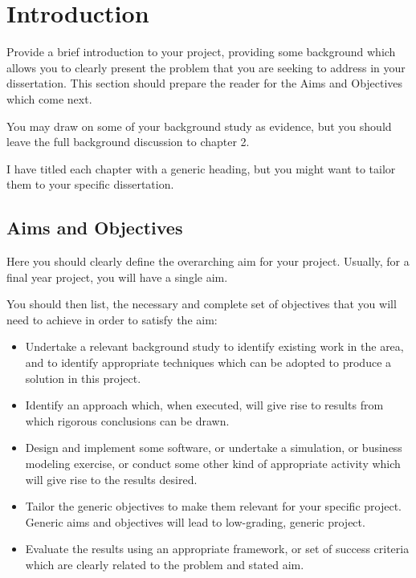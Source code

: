 %
%

\chapter{Introduction}

\renewcommand{\thepage}{\arabic{page}}
\setcounter{page}{1}

Provide a brief introduction to your project, providing some background which
allows you to clearly present the problem that you are seeking to address in
your dissertation.  This section should prepare the reader for the Aims and
Objectives which come next.

You may draw on some of your background study as evidence, but you should leave
the full background discussion to chapter 2.

I have titled each chapter with a generic heading, but you might want to tailor
them to your specific dissertation.

\section{Aims and Objectives}

Here you should clearly define the overarching aim for your project.  Usually,
for a final year project, you will have a single aim.

You should then list, the necessary and complete set of objectives that you
will need to achieve in order to satisfy the aim:

\begin{itemize}
  \item Undertake a relevant background study to identify existing work in the
    area, and to identify appropriate techniques which can be adopted to
    produce a solution in this project.
  \item Identify an approach which, when executed, will give rise to results
    from which rigorous conclusions can be drawn.
  \item Design and implement some software, or undertake a simulation, or
    business modeling exercise, or conduct some other kind of appropriate
    activity which will give rise to the results desired.
  \item Tailor the generic objectives to make them relevant for your specific
    project.  Generic aims and objectives will lead to low-grading, generic
    project.
  \item Evaluate the results using an appropriate framework, or set of success
    criteria which are clearly related to the problem and stated aim.
\end{itemize}

